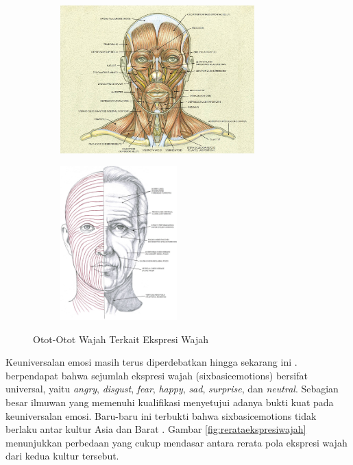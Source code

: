 \begin{figure}[t]
    \centering
    \begin{subfigure}[t]{7.5cm}
        \includegraphics[width=7.5cm]{gambar/classic_human_anatomy_motion1.jpg}
    \end{subfigure}
    \begin{subfigure}[t]{4.5cm}
        \includegraphics[width=4.5cm]{gambar/classic_human_anatomy_motion2.jpg}
    \end{subfigure}
    \caption[Otot-Otot Wajah Terkait Ekspresi Wajah]{Otot-Otot Wajah Terkait Ekspresi Wajah \protect{}}
    \label{fig:musclesface}
\end{figure}
Keuniversalan emosi masih terus diperdebatkan hingga sekarang ini .  berpendapat bahwa sejumlah ekspresi wajah (\gls{sixbasicemotions}) bersifat universal, yaitu \textit{angry}, \textit{disgust}, \textit{fear}, \textit{happy}, \textit{sad}, \textit{surprise}, dan \textit{neutral}. Sebagian besar ilmuwan yang memenuhi kualifikasi  menyetujui adanya bukti kuat pada keuniversalan emosi. Baru-baru ini terbukti bahwa \gls{sixbasicemotions} tidak berlaku antar kultur Asia dan Barat . Gambar \ref{fig:rerataekspresiwajah} menunjukkan perbedaan yang cukup mendasar antara rerata pola ekspresi wajah dari kedua kultur tersebut.

